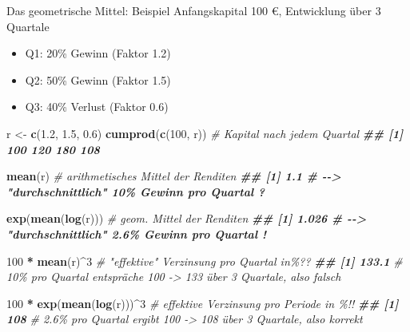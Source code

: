 \documentclass[
  10pt,
  ignorenonframetext,
]{beamer}
\newenvironment{Shaded}{\begin{snugshade}}{\end{snugshade}}
\newcommand{\CommentTok}[1]{\textcolor[rgb]{0.56,0.35,0.01}{\textit{#1}}}
\newcommand{\DecValTok}[1]{\textcolor[rgb]{0.00,0.00,0.81}{#1}}
\newcommand{\DocumentationTok}[1]{\textcolor[rgb]{0.56,0.35,0.01}{\textbf{\textit{#1}}}}
\newcommand{\FloatTok}[1]{\textcolor[rgb]{0.00,0.00,0.81}{#1}}
\newcommand{\FunctionTok}[1]{\textcolor[rgb]{0.13,0.29,0.53}{\textbf{#1}}}
\newcommand{\NormalTok}[1]{#1}
\newcommand{\OtherTok}[1]{\textcolor[rgb]{0.56,0.35,0.01}{#1}}
\newcommand{\SpecialCharTok}[1]{\textcolor[rgb]{0.81,0.36,0.00}{\textbf{#1}}}
\providecommand{\tightlist}{%
  \setlength{\itemsep}{0pt}\setlength{\parskip}{0pt}}
\begin{document}
\begin{frame}[fragile]{Das geometrische Mittel: Beispiel}
\label{das-geometrische-mittel-beispiel}
Anfangskapital 100 €, Entwicklung über 3 Quartale

\begin{itemize}
\tightlist
\item
  Q1: 20\% Gewinn (Faktor 1.2)
\item
  Q2: 50\% Gewinn (Faktor 1.5)
\item
  Q3: 40\% Verlust (Faktor 0.6)\\
\end{itemize}

\scriptsize

\begin{Shaded}
\begin{Highlighting}[]
\NormalTok{r }\OtherTok{\textless{}{-}} \FunctionTok{c}\NormalTok{(}\FloatTok{1.2}\NormalTok{, }\FloatTok{1.5}\NormalTok{, }\FloatTok{0.6}\NormalTok{)}
\FunctionTok{cumprod}\NormalTok{(}\FunctionTok{c}\NormalTok{(}\DecValTok{100}\NormalTok{, r)) }\CommentTok{\# Kapital nach jedem Quartal}
\DocumentationTok{\#\# [1] 100 120 180 108}

\FunctionTok{mean}\NormalTok{(r) }\CommentTok{\# arithmetisches Mittel der Renditen}
\DocumentationTok{\#\# [1] 1.1 \# {-}{-}\textgreater{} "durchschnittlich" 10\% Gewinn pro Quartal ?}

\FunctionTok{exp}\NormalTok{(}\FunctionTok{mean}\NormalTok{(}\FunctionTok{log}\NormalTok{(r))) }\CommentTok{\# geom. Mittel der Renditen}
\DocumentationTok{\#\# [1] 1.026 \# {-}{-}\textgreater{} "durchschnittlich" 2.6\% Gewinn pro Quartal !}

\DecValTok{100} \SpecialCharTok{*} \FunctionTok{mean}\NormalTok{(r)}\SpecialCharTok{\^{}}\DecValTok{3} \CommentTok{\# "effektive" Verzinsung pro Quartal in\%??}
\DocumentationTok{\#\# [1] 133.1}
\CommentTok{\# 10\% pro Quartal entspräche 100 {-}\textgreater{} 133 über 3 Quartale, also falsch}

\DecValTok{100} \SpecialCharTok{*} \FunctionTok{exp}\NormalTok{(}\FunctionTok{mean}\NormalTok{(}\FunctionTok{log}\NormalTok{(r)))}\SpecialCharTok{\^{}}\DecValTok{3}  \CommentTok{\# effektive Verzinsung pro Periode in \%!! }
\DocumentationTok{\#\# [1] 108}
\CommentTok{\# 2.6\% pro Quartal ergibt 100 {-}\textgreater{} 108 über 3 Quartale, also korrekt}
\end{Highlighting}
\end{Shaded}
\end{frame}
\end{document}
